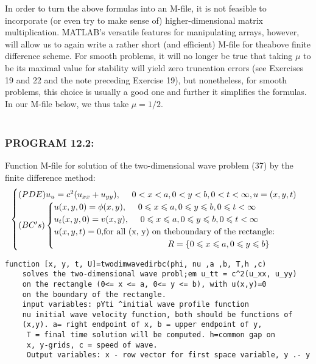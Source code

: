 \documentclass[../main.tex]{subfiles}
\begin{document}
{{In order to turn the above formulas into an M-file, it is not feasible to incorporate (or even try to make sense of) higher-dimensional matrix multiplication. MATLAB's versatile features for manipulating arrays, however, will allow us to again write a rather short (and efficient) M-file for theabove finite difference scheme. For smooth problems, it will no longer be true that taking $\mu$ to be its maximal value for stability will yield zero truncation errors (see Exercises 19 and 22 and the note preceding Exercise 19), but nonetheless, for smooth problems, this choice is usually a good one and further it simplifies the formulas. In our M-file below, we thus take $\mu = 1 / 2$. 
\\
\\
\subsubsection{PROGRAM 12.2:} Function M-file for solution of the two-dimensional wave problem (37) 
by the finite difference method:
\begin{equation}
	\begin{cases} 
	(PDE) u_u=c^2 (u_{xx}+u_{yy}),~~~~0<x<a, 0<y<b,0<t<\infty,u=(x,y,t)\\
(BC's)
		\begin{cases}
		u(x,y,0)=\phi(x,y), ~~~~ 0\leqslant x \leqslant a,0\leqslant y \leqslant b, 0 \leqslant t< \infty \\
		u_t(x,y,0)=v(x,y), ~~~~ 0\leqslant x \leqslant a,0\leqslant y \leqslant b, 0 \leqslant t< \infty \\
		 u(x, y, t) = 0, $for all (x, y) on theboundary of the rectangle:$\\
		 ~~~~~~~~~~~~~~~~~~~~~~~~~~~~~~~~~~~~~~~~ R= \lbrace 0\leqslant x\leqslant a, 0\leqslant y \leqslant b \rbrace
		\end{cases} 
	\end{cases}
\end{equation}
\begin{lstlisting}[numbers=none] 
 function [x, y, t, U]=twodimwavedirbc(phi, nu ,a ,b, T,h ,c)
 	solves the two-dimensional wave probl;em u_tt = c^2(u_xx, u_yy)
 	on the rectangle (0<= x <= a, 0<= y <= b), with u(x,y)=0
 	on the boundary of the rectangle. 
	input variables: pYti ^initial wave profile function 
	nu initial wave velocity function, both should be functions of 
	(x,y). a= right endpoint of x, b = upper endpoint of y, 
	 T = final time solution will be computed. h=common gap on 
	 x, y-grids, c = speed of wave. 
	 Output variables: x - row vector for first space variable, y .- y

\end{lstlisting}}}
\end{document}
